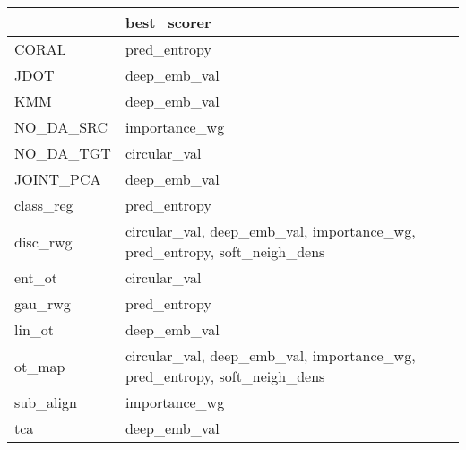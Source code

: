 \begin{tabular}{ll}
\hline
           & best\_scorer                                                              \\
\hline
 CORAL     & pred\_entropy                                                             \\
 JDOT      & deep\_emb\_val                                                             \\
 KMM       & deep\_emb\_val                                                             \\
 NO\_DA\_SRC & importance\_wg                                                            \\
 NO\_DA\_TGT & circular\_val                                                             \\
 JOINT\_PCA & deep\_emb\_val                                                             \\
 class\_reg & pred\_entropy                                                             \\
 disc\_rwg  & circular\_val, deep\_emb\_val, importance\_wg, pred\_entropy, soft\_neigh\_dens \\
 ent\_ot    & circular\_val                                                             \\
 gau\_rwg   & pred\_entropy                                                             \\
 lin\_ot    & deep\_emb\_val                                                             \\
 ot\_map    & circular\_val, deep\_emb\_val, importance\_wg, pred\_entropy, soft\_neigh\_dens \\
 sub\_align & importance\_wg                                                            \\
 tca       & deep\_emb\_val                                                             \\
\hline
\end{tabular}